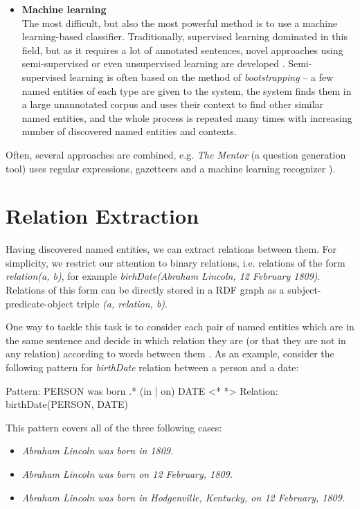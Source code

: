 \documentclass[12pt, twoside]{fithesis2}
\renewcommand{\_}{\leavevmode \kern0.07em\vbox{\hrule width0.4em}}
\newcommand{\squarebullet}{\textcolor{black}{\raisebox{0.15em}{\rule{4pt}{4pt}}}}
\newcommand{\emptysquarebullet}{\textcolor{black}{\raisebox{0.10em}{\tiny$\square$}}}
\newenvironment{myItemize}{
  \begin{itemize}[leftmargin=2em,rightmargin=1em,itemsep=\parskip ,parsep=0em,topsep=0em,partopsep=0em]
  \renewcommand{\labelitemi}{\squarebullet}
  \renewcommand{\labelitemii}{\textbullet}
}{
  \end{itemize}
}
\newcommand{\arrowlinesplit}{%
  \noindent\makebox[\linewidth]{\raisebox{0.15em}{\rule{0.478\textwidth}{0.5pt}}%
  ~$\downarrow$~%
  \noindent\raisebox{0.15em}{\rule{0.478\textwidth}{0.5pt}}}%
}
\begin{document}
\begin{myItemize}
\item \textbf{Machine learning}\\
  The most difficult, but also the most powerful method is to use a machine learning-based classifier.
  Traditionally, supervised learning dominated in this field,
  but as it requires a lot of annotated sentences,
  novel approaches using semi-supervised or even unsupervised learning are developed
  \cite{named-entity-recognition}.
  Semi-supervised learning is often based on the method of \emph{bootstrapping} -- a few named entities of each type are given to the system, the system finds them in a large unannotated corpus and uses their context to find other similar named entities, and the whole process is repeated many times with increasing number of discovered named entities and contexts.
\end{myItemize}
Often, several approaches are combined, e.g. \textit{The Mentor} (a question generation tool) uses regular expressions, gazetteers and a machine learning recognizer \cite{mentor}).


\section{Relation Extraction}
\label{sec:relations-extraction}

Having discovered named entities, we can extract relations between them.
For simplicity, we restrict our attention to binary relations,
i.e. relations of the form \emph{relation(a, b)},
for example \emph{birhDate(Abraham Lincoln, 12 February 1809)}.
Relations of this form can be directly stored in a RDF graph as a subject-predicate-object triple
\emph{(a, relation, b)}.

One way to tackle this task is to consider each pair of named entities which are in the same sentence and decide in which relation they are (or that they are not in any relation) according to words between them \cite[][284]{nlp-python}.
As an example, consider the following pattern for \emph{birthDate} relation between a person and a date:
\begin{code}
Pattern: PERSON was born .* (in | on) DATE
<*\arrowlinesplit*>
Relation: birthDate(PERSON, DATE)
\end{code}
This pattern covers all of the three following cases:
\begin{myItemize}
  \item \emph{Abraham Lincoln was born in 1809.}
  \item \emph{Abraham Lincoln was born on 12 February, 1809.}
  \item \emph{Abraham Lincoln was born in Hodgenville, Kentucky, on 12 February, 1809.}
\end{myItemize}
\end{document}
